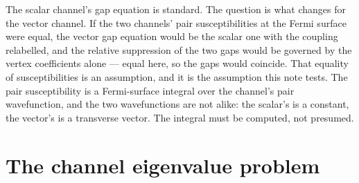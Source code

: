 \documentclass[11pt]{article}
\begin{document}
The scalar channel's gap equation is standard. The question is what changes for the vector channel. If the two channels' pair susceptibilities at the Fermi surface were equal, the vector gap equation would be the scalar one with the coupling relabelled, and the relative suppression of the two gaps would be governed by the vertex coefficients alone --- equal here, so the gaps would coincide. That equality of susceptibilities is an assumption, and it is the assumption this note tests. The pair susceptibility is a Fermi-surface integral over the channel's pair wavefunction, and the two wavefunctions are not alike: the scalar's is a constant, the vector's is a transverse vector. The integral must be computed, not presumed.

\section{The channel eigenvalue problem}
\end{document}
